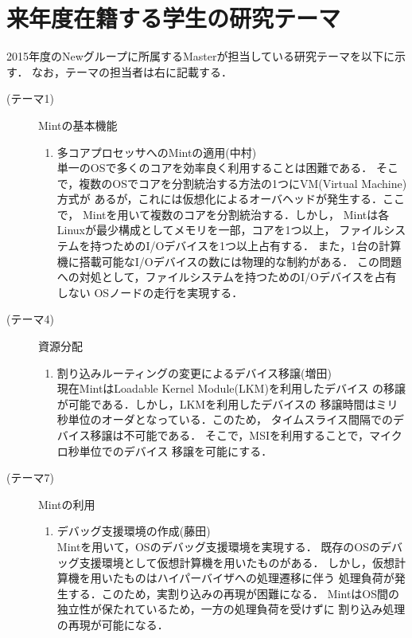 \documentclass[12pt]{jsarticle}
\begin{document}
\section{来年度在籍する学生の研究テーマ}
2015年度のNewグループに所属するMasterが担当している研究テーマを以下に示す．
なお，テーマの担当者は右に記載する．
\begin{description}
    \item[(テーマ1)] Mintの基本機能
        \begin{enumerate}
            \item 多コアプロセッサへのMintの適用(中村)\\
                単一のOSで多くのコアを効率良く利用することは困難である．
                そこで，複数のOSでコアを分割統治する方法の1つにVM(Virtual Machine)方式が
                あるが，これには仮想化によるオーバヘッドが発生する．ここで，
                Mintを用いて複数のコアを分割統治する．しかし，
                Mintは各Linuxが最少構成としてメモリを一部，コアを1つ以上，
                ファイルシステムを持つためのI/Oデバイスを1つ以上占有する．
                また，1台の計算機に搭載可能なI/Oデバイスの数には物理的な制約がある．
                この問題への対処として，ファイルシステムを持つためのI/Oデバイスを占有しない
                OSノードの走行を実現する．
        \end{enumerate}
    \item[(テーマ4)] 資源分配
        \begin{enumerate}
            \item 割り込みルーティングの変更によるデバイス移譲(増田)\\
                現在MintはLoadable Kernel Module(LKM)を利用したデバイス
                の移譲が可能である．しかし，LKMを利用したデバイスの
                移譲時間はミリ秒単位のオーダとなっている．このため，
                タイムスライス間隔でのデバイス移譲は不可能である．
                そこで，MSIを利用することで，マイクロ秒単位でのデバイス
                移譲を可能にする．
        \end{enumerate}
    \item[(テーマ7)]Mintの利用
        \begin{enumerate}
            \item デバッグ支援環境の作成(藤田)\\
                Mintを用いて，OSのデバッグ支援環境を実現する．
                既存のOSのデバッグ支援環境として仮想計算機を用いたものがある．
                しかし，仮想計算機を用いたものはハイパーバイザへの処理遷移に伴う
                処理負荷が発生する．このため，実割り込みの再現が困難になる．
                MintはOS間の独立性が保たれているため，一方の処理負荷を受けずに
                割り込み処理の再現が可能になる．
        \end{enumerate}
\end{description}
\end{document}
